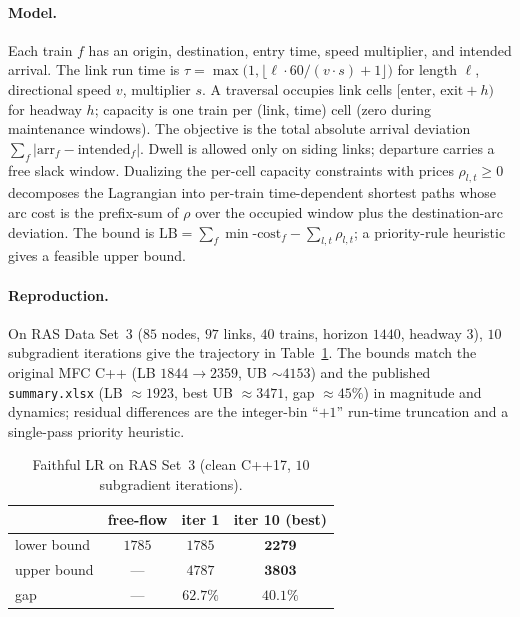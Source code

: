 \documentclass[11pt]{article}
\begin{document}
\paragraph{Model.} Each train $f$ has an origin, destination, entry time, speed multiplier,
and intended arrival. The link run time is $\tau = \max\!\big(1, \lfloor \ell\cdot 60/(v\cdot
s) + 1\rfloor\big)$ for length $\ell$, directional speed $v$, multiplier $s$. A traversal
occupies link cells $[\text{enter},\,\text{exit}+h)$ for headway $h$; capacity is one train
per (link, time) cell (zero during maintenance windows). The objective is the total absolute
arrival deviation $\sum_f |\text{arr}_f - \text{intended}_f|$. Dwell is allowed only on
siding links; departure carries a free slack window. Dualizing the per-cell capacity
constraints with prices $\rho_{l,t}\ge 0$ decomposes the Lagrangian into per-train
time-dependent shortest paths whose arc cost is the prefix-sum of $\rho$ over the occupied
window plus the destination-arc deviation. The bound is
$\mathrm{LB}=\sum_f \min\text{-cost}_f - \sum_{l,t}\rho_{l,t}$; a priority-rule heuristic
gives a feasible upper bound.

\paragraph{Reproduction.} On RAS Data Set~3 ($85$ nodes, $97$ links, $40$ trains, horizon
$1440$, headway $3$), $10$ subgradient iterations give the trajectory in
Table~\ref{tab:lr}. The bounds match the original MFC C++ (LB $1844\!\to\!2359$, UB
$\sim\!4153$) and the published \texttt{summary.xlsx} (LB $\approx 1923$, best UB
$\approx 3471$, gap $\approx 45\%$) in magnitude and dynamics; residual differences are the
integer-bin ``$+1$'' run-time truncation and a single-pass priority heuristic.

\begin{table}[h]\centering
\caption{Faithful LR on RAS Set~3 (clean C++17, $10$ subgradient iterations).}
\label{tab:lr}
\begin{tabular}{lccc}
\toprule
 & free-flow & iter 1 & iter 10 (best) \\
\midrule
lower bound & $1785$ & $1785$ & $\mathbf{2279}$ \\
upper bound & --- & $4787$ & $\mathbf{3803}$ \\
gap & --- & $62.7\%$ & $\mathbf{40.1\%}$ \\
\bottomrule
\end{tabular}
\end{table}
\end{document}
